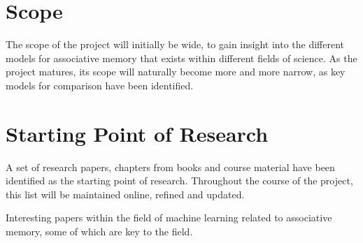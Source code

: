 \documentclass[12pt, a4paper]{article}
\begin{document}
\section{Scope}


The scope of the project will initially be wide, to gain insight into the different models for associative memory that exists within different fields of science. As the project matures, its scope will naturally become more and more narrow, as key models for comparison have been identified.

\section{Starting Point of Research}

A set of research papers, chapters from books and course material have been identified as the starting point of research. Throughout the course of the project, this list will be maintained online, refined and updated.

Interesting papers within the field of machine learning related to associative memory, some of which are key to the field.
\end{document}

